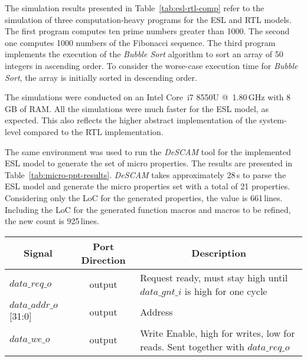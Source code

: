 The simulation results presented in Table~\ref{tab:esl-rtl-comp} refer to the simulation of three computation-heavy programs for the ESL and RTL models. The first program computes ten prime numbers greater than 1000. The second one computes 1000 numbers of the Fibonacci sequence. The third program implements the execution of the \textit{Bubble Sort} algorithm to sort an array of 50 integers in ascending order. To consider the worse-case execution time for \textit{Bubble Sort}, the array is initially sorted in descending order.

The simulations were conducted on an Intel Core~i7 8550U @~1.80\,GHz with 8\,GB of RAM. All the simulations were much faster for the ESL model, as expected. This also reflects the higher abstract implementation of the system-level compared to the RTL implementation.

The same environment was used to run the \textit{DeSCAM} tool for the implemented ESL model to generate the set of micro properties. The results are presented in Table~\ref{tab:micro-ppt-results}. \textit{DeSCAM} takes approximately 28\,s to parse the ESL model and generate the micro properties set with a total of 21 properties. Considering only the LoC for the generated properties, the value is 661\,lines. Including the LoC for the generated function macros and macros to be refined, the new count is 925\,lines.

\begin{table*}[htb!] 
	\centering 
	\caption{LSU port signals of RI5CY processor\cite{manual-ri5cy}.} 
	\label{tab:micro-ppt-results}
	\begin{tabular}{l|c|p{7cm}} 
		\multicolumn{1}{c}{\bfseries Signal} & \multicolumn{1}{c}{\bfseries Port Direction} & \multicolumn{1}{c}{\bfseries Description} \\     
		\hline	
		$data\_req\_o$  &  output & Request ready, must stay high until $data\_gnt\_i$ is        high for one cycle \\
		\hline
		$data\_addr\_o$[31:0]  &  output & Address \\
		\hline
		$data\_we\_o$  &  output & Write Enable, high for writes, low for reads. Sent            together with $data\_req\_o$ \\
	\end{tabular} 
\end{table*}

